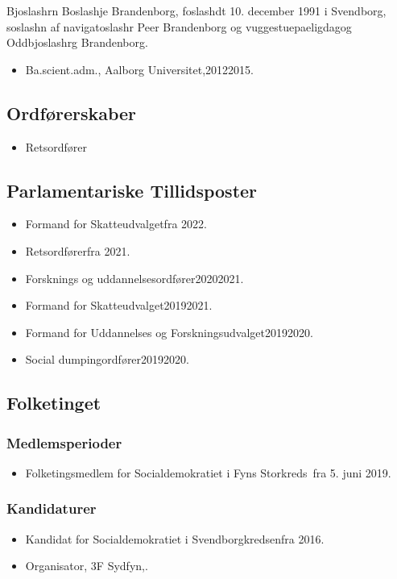 \documentclass[11pt, a4paper]{awesome-cv}
\begin{document}
\makecvheader[R]
\makelettertitle
\begin{cvletter}
Bjoslashrn Boslashje Brandenborg, foslashdt 10. december 1991 i Svendborg, soslashn af navigatoslashr Peer Brandenborg og vuggestuepaeligdagog Oddbjoslashrg Brandenborg.

\begin{itemize}
\item Ba.scient.adm., Aalborg Universitet,20122015.
\end{itemize}
\subsection*{Ordførerskaber}
\begin{itemize}
\item Retsordfører
\end{itemize}
\subsection*{Parlamentariske Tillidsposter}
\begin{itemize}
\item Formand for Skatteudvalgetfra 2022.
\item Retsordførerfra 2021.
\item Forsknings og uddannelsesordfører20202021.
\item Formand for Skatteudvalget20192021.
\item Formand for Uddannelses og Forskningsudvalget20192020.
\item Social dumpingordfører20192020.
\end{itemize}
\subsection*{Folketinget}
\subsubsection*{Medlemsperioder}
\begin{itemize}
\item Folketingsmedlem for Socialdemokratiet i Fyns Storkreds fra 5. juni 2019.
\end{itemize}
\subsubsection*{Kandidaturer}
\begin{itemize}
\item Kandidat for Socialdemokratiet i Svendborgkredsenfra 2016.
\end{itemize}
\begin{itemize}
\item Organisator, 3F Sydfyn,.
\end{itemize}
\end{cvletter}
\end{document}
